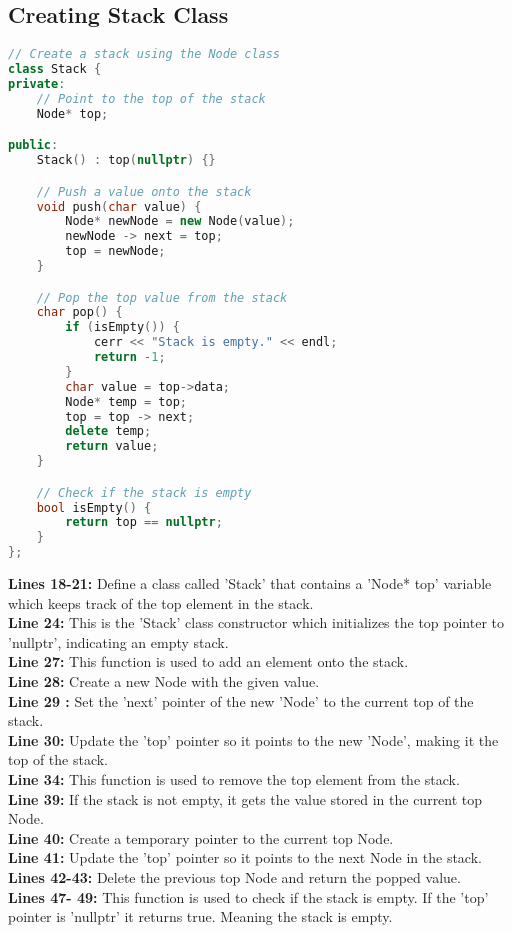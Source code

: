 \documentclass[letterpaper, 10pt,DIV=13]{scrartcl}
\numberwithin{equation}{section} %
\numberwithin{figure}{section} %
\numberwithin{table}{section} %
\begin{document}
\subsection{Creating Stack Class}
\begin{linenumbers}
\begin{lstlisting}[language=C++, caption={Stack Class}, label={code:example}]
// Create a stack using the Node class
class Stack {
private:
    // Point to the top of the stack
    Node* top;

public:
    Stack() : top(nullptr) {}

    // Push a value onto the stack
    void push(char value) {
        Node* newNode = new Node(value);
        newNode -> next = top;
        top = newNode;
    }

    // Pop the top value from the stack
    char pop() {
        if (isEmpty()) {
            cerr << "Stack is empty." << endl;
            return -1;
        }
        char value = top->data;
        Node* temp = top;
        top = top -> next;
        delete temp;
        return value;
    }

    // Check if the stack is empty
    bool isEmpty() {
        return top == nullptr;
    }
};
\end{lstlisting}
\end{linenumbers}
\nolinenumbers

\textbf{Lines 18-21:} Define a class called 'Stack' that contains a 'Node* top' variable which keeps track of the top element in the stack. \\
\textbf{Line 24:} This is the 'Stack' class constructor which initializes the top pointer to 'nullptr', indicating an empty stack. \\
\textbf{Line 27:} This function is used to add an element onto the stack. \\
\textbf{Line 28:} Create a new Node with the given value. \\
\textbf{Line 29 :} Set the 'next' pointer of the new 'Node' to the current top of the stack. \\
\textbf{Line 30:} Update the 'top' pointer so it points to the new 'Node', making it the top of the stack. \\
\textbf{Line 34:} This function is used to remove the top element from the stack. \\
\textbf{Line 39:} If the stack is not empty, it gets the value stored in the current top Node. \\
\textbf{Line 40:} Create a temporary pointer to the current top Node. \\
\textbf{Line 41:} Update the 'top' pointer so it points to the next Node in the stack. \\
\textbf{Lines 42-43:} Delete the previous top Node and return the popped value. \\
\textbf{Lines 47- 49:} This function is used to check if the stack is empty. If the 'top' pointer is 'nullptr' it returns true. Meaning the stack is empty.
\end{document}

